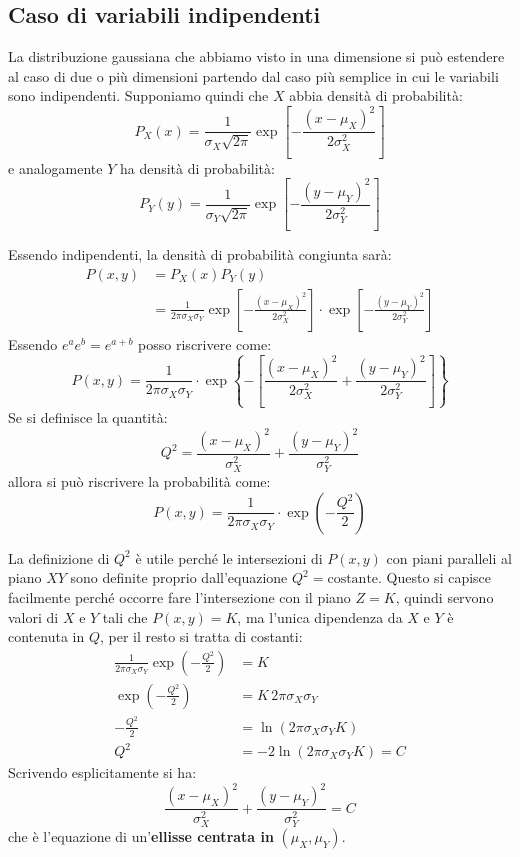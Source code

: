 \documentclass[openany,a4paper,12pt]{book}
\theoremstyle{remark}
\begin{document}
\subsection*{Caso di variabili indipendenti}
La distribuzione gaussiana che abbiamo visto in una dimensione si può estendere al caso di due o più dimensioni partendo dal caso più semplice in cui le variabili sono indipendenti. Supponiamo quindi che $X$ abbia densità di probabilità:
\begin{equation}
    P_X(x) = \frac{1}{\sigma_X \sqrt{2\pi}} \exp\left[ -\frac{(x-\mu_X)^2}{2\sigma_X^2} \right]
\end{equation}
e analogamente $Y$ ha densità di probabilità:
\begin{equation}
    P_Y(y) = \frac{1}{\sigma_Y \sqrt{2\pi}} \exp\left[ -\frac{(y-\mu_Y)^2}{2\sigma_Y^2} \right]
\end{equation}

Essendo indipendenti, la densità di probabilità congiunta sarà:
\begin{align*}
    P(x,y) &= P_X(x) P_Y(y) \\
           &= \frac{1}{2\pi \sigma_X \sigma_Y} \exp\left[ -\frac{(x-\mu_X)^2}{2\sigma_X^2} \right] \cdot \exp\left[ -\frac{(y-\mu_Y)^2}{2\sigma_Y^2} \right]
\end{align*}
Essendo $e^a e^b = e^{a+b}$ posso riscrivere come:
\begin{equation}
    P(x,y) = \frac{1}{2\pi \sigma_X \sigma_Y} \cdot \exp\left\{ -\left[ \frac{(x-\mu_X)^2}{2\sigma_X^2} + \frac{(y-\mu_Y)^2}{2\sigma_Y^2} \right] \right\}
\end{equation}
Se si definisce la quantità:
\begin{equation}
    Q^2 = \frac{(x-\mu_X)^2}{\sigma_X^2} + \frac{(y-\mu_Y)^2}{\sigma_Y^2}
\end{equation}
allora si può riscrivere la probabilità come:
\begin{equation}
    P(x,y) = \frac{1}{2\pi \sigma_X \sigma_Y} \cdot \exp\left( -\frac{Q^2}{2} \right)
\end{equation}

La definizione di $Q^2$ è utile perché le intersezioni di $P(x,y)$ con piani paralleli al piano $XY$ sono definite proprio dall'equazione $Q^2 = \text{costante}$. Questo si capisce facilmente perché occorre fare l'intersezione con il piano $Z=K$, quindi servono valori di $X$ e $Y$ tali che $P(x,y) = K$, ma l'unica dipendenza da $X$ e $Y$ è contenuta in $Q$, per il resto si tratta di costanti:
\begin{align*}
    \frac{1}{2\pi \sigma_X \sigma_Y} \exp\left( -\frac{Q^2}{2} \right) &= K \\
    \exp\left( -\frac{Q^2}{2} \right) &= K \, 2\pi \sigma_X \sigma_Y \\
    -\frac{Q^2}{2} &= \ln(2\pi \sigma_X \sigma_Y K) \\
    Q^2 &= -2\ln(2\pi \sigma_X \sigma_Y K) = C
\end{align*}
Scrivendo esplicitamente si ha:
\begin{equation}
    \frac{(x-\mu_X)^2}{\sigma_X^2} + \frac{(y-\mu_Y)^2}{\sigma_Y^2} = C
\end{equation}
che è l'equazione di un'\textbf{ellisse centrata in} $(\mu_X, \mu_Y)$.
\end{document}
